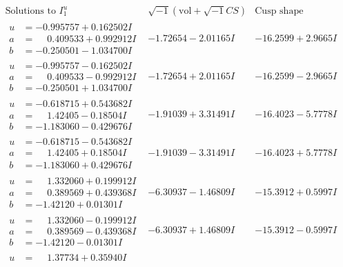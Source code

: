 \documentclass[1p]{elsarticle_modified}
\theoremstyle{definition}
\newcommand{\I}{\sqrt{-1}}
\begin{document}
$$\begin{array}{c|c|c}  
\text{Solutions to }I^u_{1}& \I (\text{vol} + \sqrt{-1}CS) & \text{Cusp shape}\\
 \hline 
\begin{aligned}
u &= -0.995757 + 0.162502 I \\
a &= \phantom{-}0.409533 + 0.992912 I \\
b &= -0.250501 - 1.034700 I\end{aligned}
 & -1.72654 - 2.01165 I & -16.2599 + 2.9665 I \\ \hline\begin{aligned}
u &= -0.995757 - 0.162502 I \\
a &= \phantom{-}0.409533 - 0.992912 I \\
b &= -0.250501 + 1.034700 I\end{aligned}
 & -1.72654 + 2.01165 I & -16.2599 - 2.9665 I \\ \hline\begin{aligned}
u &= -0.618715 + 0.543682 I \\
a &= \phantom{-}1.42405 - 0.18504 I \\
b &= -1.183060 - 0.429676 I\end{aligned}
 & -1.91039 + 3.31491 I & -16.4023 - 5.7778 I \\ \hline\begin{aligned}
u &= -0.618715 - 0.543682 I \\
a &= \phantom{-}1.42405 + 0.18504 I \\
b &= -1.183060 + 0.429676 I\end{aligned}
 & -1.91039 - 3.31491 I & -16.4023 + 5.7778 I \\ \hline\begin{aligned}
u &= \phantom{-}1.332060 + 0.199912 I \\
a &= \phantom{-}0.389569 + 0.439368 I \\
b &= -1.42120 + 0.01301 I\end{aligned}
 & -6.30937 - 1.46809 I & -15.3912 + 0.5997 I \\ \hline\begin{aligned}
u &= \phantom{-}1.332060 - 0.199912 I \\
a &= \phantom{-}0.389569 - 0.439368 I \\
b &= -1.42120 - 0.01301 I\end{aligned}
 & -6.30937 + 1.46809 I & -15.3912 - 0.5997 I \\ \hline\begin{aligned}
u &= \phantom{-}1.37734 + 0.35940 I \\

\end{aligned}
\end{array}$$
\end{document}

